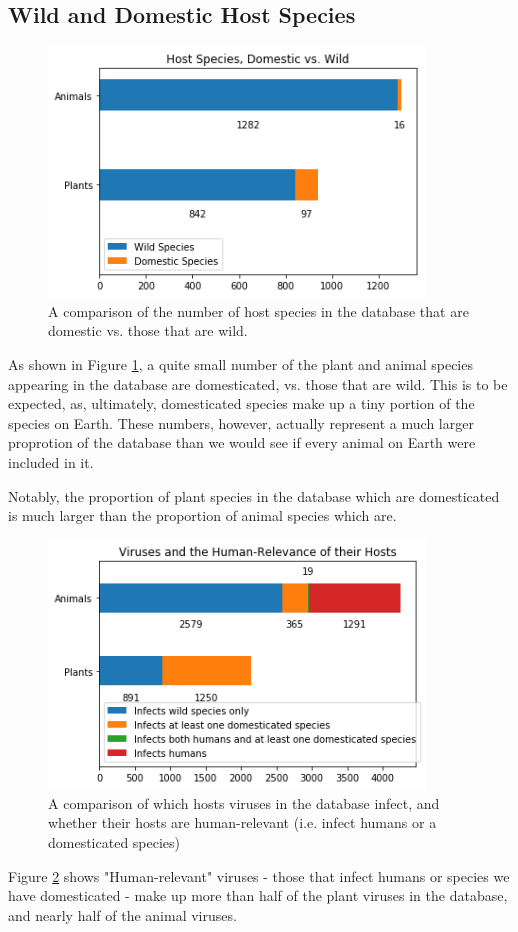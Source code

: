 \documentclass[12pt]{article}
\begin{document}
    \subsection{Wild and Domestic Host Species}

    \begin{figure}[H]
        \begin{center}
            \includegraphics[width=100mm]{host_species_domestic_wild_figure.png}
            \caption{A comparison of the number of host species in the database
            that are domestic vs. those that are wild.}
            \label{host_species_domestic_wild_figure}
        \end{center}
    \end{figure}

    As shown in Figure \ref{host_species_domestic_wild_figure}, a quite small
    number of the plant and animal species appearing in the database are
    domesticated, vs. those that are wild. This is to be expected, as,
    ultimately, domesticated species make up a tiny portion of the species
    on Earth. These numbers, however, actually represent a much larger
    proprotion of the database than we would see if every animal on Earth
    were included in it.

    Notably, the proportion of plant species in the database which are
    domesticated is much larger than the proportion of animal species which
    are.

    \begin{figure}[H]
        \begin{center}
            \includegraphics[width=100mm]{viruses_human_relevance.png}
            \caption{A comparison of which hosts viruses in the database
            infect, and whether their hosts are human-relevant (i.e. infect
            humans or a domesticated species)}
            \label{viruses_human_relevance_figure}
        \end{center}
    \end{figure}

    Figure \ref{viruses_human_relevance_figure} shows "Human-relevant" viruses
    - those that infect humans or species we have domesticated - make up more
    than half of the plant viruses in the database, and nearly half of the animal
    viruses.
    
\end{document}
